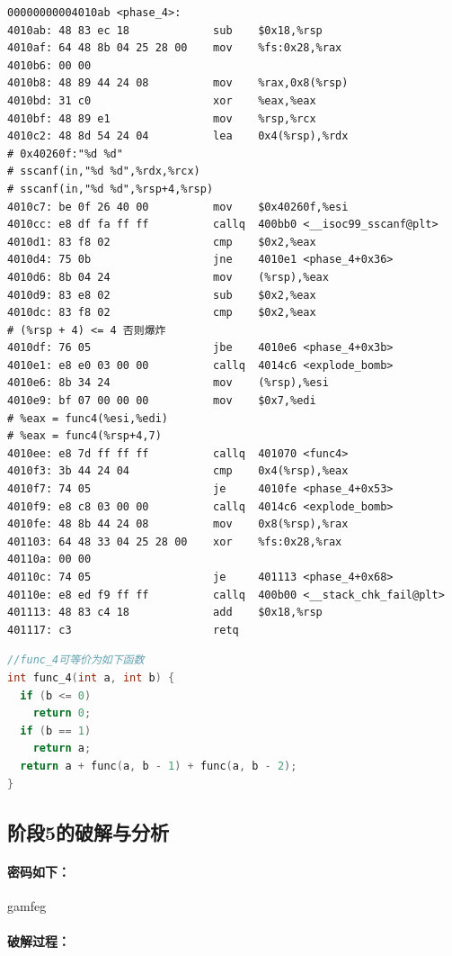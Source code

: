 \begin{lstlisting}
00000000004010ab <phase_4>:
4010ab:	48 83 ec 18          	sub    $0x18,%rsp
4010af:	64 48 8b 04 25 28 00 	mov    %fs:0x28,%rax
4010b6:	00 00 
4010b8:	48 89 44 24 08       	mov    %rax,0x8(%rsp)
4010bd:	31 c0                	xor    %eax,%eax
4010bf:	48 89 e1             	mov    %rsp,%rcx
4010c2:	48 8d 54 24 04       	lea    0x4(%rsp),%rdx
# 0x40260f:"%d %d"
# sscanf(in,"%d %d",%rdx,%rcx)
# sscanf(in,"%d %d",%rsp+4,%rsp)
4010c7:	be 0f 26 40 00       	mov    $0x40260f,%esi
4010cc:	e8 df fa ff ff       	callq  400bb0 <__isoc99_sscanf@plt>
4010d1:	83 f8 02             	cmp    $0x2,%eax
4010d4:	75 0b                	jne    4010e1 <phase_4+0x36>
4010d6:	8b 04 24             	mov    (%rsp),%eax
4010d9:	83 e8 02             	sub    $0x2,%eax
4010dc:	83 f8 02             	cmp    $0x2,%eax
# (%rsp + 4) <= 4 否则爆炸
4010df:	76 05                	jbe    4010e6 <phase_4+0x3b>
4010e1:	e8 e0 03 00 00       	callq  4014c6 <explode_bomb>
4010e6:	8b 34 24             	mov    (%rsp),%esi
4010e9:	bf 07 00 00 00       	mov    $0x7,%edi
# %eax = func4(%esi,%edi)
# %eax = func4(%rsp+4,7)
4010ee:	e8 7d ff ff ff       	callq  401070 <func4>
4010f3:	3b 44 24 04          	cmp    0x4(%rsp),%eax
4010f7:	74 05                	je     4010fe <phase_4+0x53>
4010f9:	e8 c8 03 00 00       	callq  4014c6 <explode_bomb>
4010fe:	48 8b 44 24 08       	mov    0x8(%rsp),%rax
401103:	64 48 33 04 25 28 00 	xor    %fs:0x28,%rax
40110a:	00 00 
40110c:	74 05                	je     401113 <phase_4+0x68>
40110e:	e8 ed f9 ff ff       	callq  400b00 <__stack_chk_fail@plt>
401113:	48 83 c4 18          	add    $0x18,%rsp
401117:	c3                   	retq   
\end{lstlisting}

\begin{lstlisting}[language = c]
//func_4可等价为如下函数
int func_4(int a, int b) {
  if (b <= 0)
    return 0;
  if (b == 1)
    return a;
  return a + func(a, b - 1) + func(a, b - 2);
}
\end{lstlisting}


\subsection{阶段5的破解与分析}

\paragraph{密码如下：}gamfeg

\paragraph{破解过程：}


